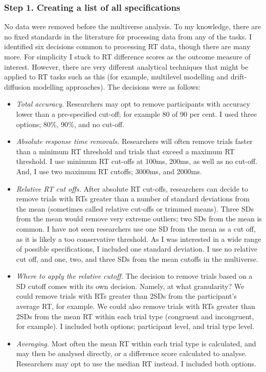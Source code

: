 \documentclass[
  english,
  man,floatsintext]{apa6}
\begin{document}
\hypertarget{step-1.-creating-a-list-of-all-specifications}{%
\subsubsection{Step 1. Creating a list of all specifications}\label{step-1.-creating-a-list-of-all-specifications}}

No data were removed before the multiverse analysis. To my knowledge, there are no fixed standards in the literature for processing data from any of the tasks. I identified six decisions common to processing RT data, though there are many more. For simplicity I stuck to RT difference scores as the outcome measure of interest. However, there are very different analytical techniques that might be applied to RT tasks such as this (for example, multilevel modelling and drift-diffusion modelling approaches). The decisions were as follows:

\begin{itemize}
\item
  \emph{Total accuracy.} Researchers may opt to remove participants with accuracy lower than a pre-specified cut-off; for example 80 of 90 per cent. I used three options; 80\%, 90\%, and no cut-off.
\item
  \emph{Absolute response time removals.} Researchers will often remove trials faster than a minimum RT threshold and trials that exceed a maximum RT threshold. I use minimum RT cut-offs at 100ms, 200ms, as well as no cut-off. And, I use two maximum RT cutoffs; 3000ms, and 2000ms.
\item
  \emph{Relative RT cut offs.} After absolute RT cut-offs, researchers can decide to remove trials with RTs greater than a number of standard deviations from the mean (sometimes called relative cut-offs or trimmed means). Three SDs from the mean would remove very extreme outliers; two SDs from the mean is common. I have not seen researchers use one SD from the mean as a cut off, as it is likely a too conservative threshold. As I was interested in a wide range of possible specifications, I included one standard deviation. I use no relative cut off, and one, two, and three SDs from the mean cutoffs in the multiverse.
\item
  \emph{Where to apply the relative cutoff.} The decision to remove trials based on a SD cutoff comes with its own decision. Namely, at what granularity? We could remove trials with RTs greater than 2SDs from the participant's average RT, for example. We could also remove trials with RTs greater than 2SDs from the mean RT within each trial type (congruent and incongruent, for example). I included both options; participant level, and trial type level.
\item
  \emph{Averaging.} Most often the mean RT within each trial type is calculated, and may then be analysed directly, or a difference score calculated to analyse. Researchers may opt to use the median RT instead. I included both options.
\end{itemize}
\end{document}
